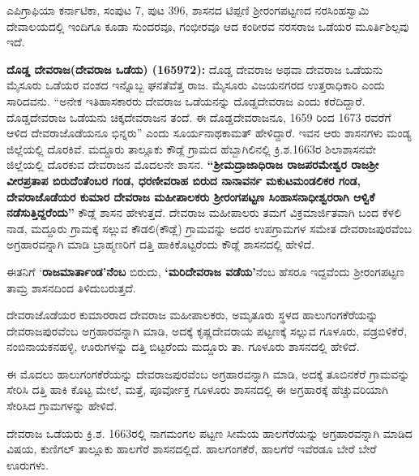 {ಎಪಿಗ್ರಾಫಿಯಾ ಕರ್ನಾಟಿಕಾ, ಸಂಪುಟ 7, ಪುಟ 396, ಶಾಸನದ ಟಿಪ್ಪಣಿ} ಶ‍್ರೀರಂಗಪಟ್ಟಣದ ನರಸಿಂಹಸ್ವಾಮಿ ದೇವಾಲಯದಲ್ಲಿ ಇಂದಿಗೂ ಕೂಡಾ ಸುಂದರವೂ, ಗಂಭೀರವೂ ಆದ ಕಂಠೀರವ ನರಸರಾಜ ಒಡೆಯರ ಮೂರ್ತಿಶಿಲ್ಪವು ಇದೆ.

\textbf{ದೊಡ್ಡ ದೇವರಾಜ(ದೇವರಾಜ ಒಡೆಯ) (1659\general{\enginline{-}}72):} ದೊಡ್ಡ ದೇವರಾಜ ಅಥವಾ ದೇವರಾಜ ಒಡೆಯನು ಮೈಸೂರು ಒಡೆಯರ ವಂಶದ ಇನ್ನೊಬ್ಬ ಘನತೆವೆತ್ತ ರಾಜ. ಮೈಸೂರು ವಿಜಯನಗರದ ಉತ್ತರಾಧಿಕಾರಿ ಎಂದು ಸಾರಿದವನು. “ಅನೇಕ ಇತಿಹಾಸಕಾರರು ದೇವರಾಜ ಒಡೆಯನನ್ನು ದೊಡ್ಡದೇವರಾಜ ಎಂದು ಕರೆದಿದ್ದಾರೆ. ದೊಡ್ಡದೇವರಾಜ ಒಡೆಯನು ಚಿಕ್ಕದೇವರಾಜನ ತಂದೆ. ಈ ದೊಡ್ಡದೇವರಾಜನೂ, 1659 ರಿಂದ 1673 ರವರೆಗೆ ಆಳಿದ ದೇವರಾಜೊಡೆಯನೂ ಭಿನ್ನರು” ಎಂದು ಸೂರ್ಯನಾಥಕಾಮತ್​ ಹೇಳಿದ್ದಾರೆ. ಇವನ ಆರು ಶಾಸನಗಳು ಮಂಡ್ಯ ಜಿಲ್ಲೆಯಲ್ಲಿ ದೊರಕಿವೆ. ಮದ್ದೂರು ತಾಲ್ಲೂಕು ಕೌಡ್ಲೆ ಗ್ರಾಮದ ಹೆಬ್ಬಾಗಿಲಿನಲ್ಲಿ ಕ್ರಿ.ಶ.1663ರ ಶಿಲಾಶಾಸನವೇ ಜಿಲ್ಲೆಯಲ್ಲಿ ದೊರಕುವ ದೇವರಾಜನ ಮೊದಲನೇ ಶಾಸನ. \textbf{“ಶ‍್ರೀಮದ್ರಾಜಾಧಿರಾಜ ರಾಜಪರಮೇಶ್ವರ ರಾಜಶ‍್ರೀ ವೀರಪ್ರತಾಪ ಬಿರುದೆಂತೆಂಬರ ಗಂಡ, ಧರಣೀವರಾಹ ಬಿರುದ ನಾನಾವರ್ನ ಮಕುಟಮಂಡಲಿಕರ ಗಂಡ, ದೇವರಾಜೊಡೆಯರ ಕುಮಾರ ದೇವರಾಜ ಮಹೀಪಾಲಕರು ಶ‍್ರೀರಂಗಪಟ್ಟಣ ಸಿಂಹಾಸನಾಧೀಶ್ವರರಾಗಿ ಆಳ್ವಿಕೆ ನಡೆಸುತ್ತಿದ್ದರೆಂದು”} ಕೌಡ್ಲೆ ಶಾಸನ ಹೇಳುತ್ತದೆ. ದೇವರಾಜ ಮಹೀಪಾಲರು ತಮಗೆ ವಿಕ್ರಮಾರ್ಜಿತವಾಗಿ ಬಂದ ಕೆಳಲಿ ನಾಡ, ಮದ್ದೂರು ಗ್ರಾಮಕ್ಕೆ ಸಲ್ಲುವ ಕೌಡಲಿ(ಕೌಡ್ಲೆ) ಗ್ರಾಮವನ್ನು ಅದರ ಉಪಗ್ರಾಮಗಳ ಸಮೇತ ದೇವರಾಜಪುರವೆಂಬ ಅಗ್ರಹಾರವನ್ನಾಗಿ ಮಾಡಿ ಬ್ರಾಹ್ಮಣರಿಗೆ ದತ್ತಿ ಹಾಕಿಕೊಟ್ಟರೆಂದು ಕೌಡ್ಲೆ ಶಾಸನದಲ್ಲಿ ಹೇಳಿದೆ.

ಈತನಿಗೆ ‘\textbf{ರಾಜಮಾರ್ತಾಂಡ’\-ನೆಂಬ} ಬಿರುದು, \textbf{‘ಮರಿದೇವರಾಜ ವಡೆಯ’}ನೆಂಬ ಹೆಸರೂ ಇದ್ದವೆಂದು ಶ‍್ರೀರಂಗಪಟ್ಟಣ ತಾಮ್ರ ಶಾಸನದಿಂದ ತಿಳಿದುಬರುತ್ತದೆ.

ದೇವರಾಜೊಡೆಯರ ಕುಮಾರರಾದ ದೇವರಾಜ ಮಹೀಪಾಲಕರು, ಅಮೃತೂರು ಸ್ಥಳದ ಹಾಲುಗಂಗಕೆರೆಯನ್ನು ದೇವರಾಜಪುರ\-ವೆಂಬ ಅಗ್ರಹಾರವನ್ನಾಗಿ ಮಾಡಿ, ಅದಕ್ಕೆ ಕೃಷ್ಣದೇವರಾಯ ಪಟ್ಟಣಕ್ಕೆ ಸಲ್ಲುವ ಗೂಳೂರು, ವಡ್ರಬಿಳಿಕೆರೆ, ನಂಬಿನಾಯಕನಹಳ್ಳಿ, ಊರುಗಳನ್ನು ದತ್ತಿ ಬಿಟ್ಟರೆಂದು ಮದ್ದೂರು ತಾ. ಗೂಳೂರು ಶಾಸನದಲ್ಲಿ ಹೇಳಿದೆ.

ಈ ಮೊದಲು ಹಾಲುಗಂಗಕೆರೆಯನ್ನು ದೇವರಾಜಪುರವೆಂಬ ಅಗ್ರಹಾರವನ್ನಾಗಿ ಮಾಡಿ, ಅದಕ್ಕೆ ತೂಬಿನಕೆರೆ ಗ್ರಾಮವನ್ನು ಸೇರಿಸಿ ದತ್ತಿ ಹಾಕಿ ಕೊಟ್ಟ ಮೇಲೆ, ಮತ್ತೆ, ಪೂರ್ವೋಕ್ತ ಗೂಳೂರು ಶಾಸನದಲ್ಲಿ ಈ ಅಗ್ರಹಾರಕ್ಕೆ ಹೆಚ್ಚುವರಿಯಾಗಿ ಸೇರಿಸಿದ ಗ್ರಾಮಗಳನ್ನು ಹೇಳಿದೆ.

ದೇವರಾಜ ಒಡೆಯರು ಕ್ರಿ.ಶ. 1663ರಲ್ಲಿ ನಾಗಮಂಗಲ ಪಟ್ಟಣ ಸೀಮೆಯ ಹಾಲಗೆರೆಯನ್ನು ಅಗ್ರಹಾರವನ್ನಾಗಿ ಮಾಡಿದ ವಿಷಯ, ಕುಣಿಗಲ್ ತಾಲ್ಲೂಕು ಹಾಲಗೆರೆ ಶಾಸನದಲ್ಲಿದೆ. ಹಾಲಗಂಗಕೆರೆ, ಹಾಲಗೆರೆ ಇವೆರಡೂ ಬೇರೆ ಬೇರೆ ಊರುಗಳು.

